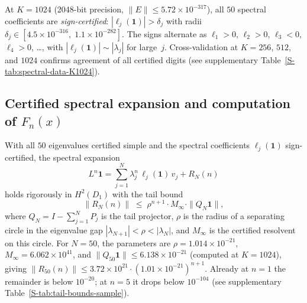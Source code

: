 At $K = 1024$ (2048-bit precision, $\|E\| \leq 5.72 \times 10^{-317}$),
all $50$ spectral coefficients are \emph{sign-certified}:
$|\ell_j(\mathbf{1})| > \delta_j$ with radii
$\delta_j \in [4.5 \times 10^{-316},\; 1.1 \times 10^{-282}]$.
The signs alternate as
$\ell_1 > 0$, $\ell_2 > 0$, $\ell_3 < 0$, $\ell_4 > 0$, \ldots,
with $|\ell_j(\mathbf{1})| \sim |\lambda_j|$ for large~$j$.
Cross-validation at $K = 256$, $512$, and $1024$ confirms agreement
of all certified digits
(see supplementary Table~\ref{S-tab:spectral-data-K1024}).

\subsection{Certified spectral expansion and computation of $F_n(x)$}
\label{sec:spectral-expansion}

With all $50$ eigenvalues certified simple and the spectral
coefficients $\ell_j(\mathbf{1})$ sign-certified, the spectral
expansion
\begin{equation}
\label{eq:spectral-exp-main}
L^n \mathbf{1}
  = \sum_{j=1}^{N} \lambda_j^n \, \ell_j(\mathbf{1}) \, v_j + R_N(n)
\end{equation}
holds rigorously in $H^2(D_1)$ with the tail bound
\begin{equation}
\label{eq:tail-bound}
\|R_N(n)\| \;\leq\; \rho^{n+1} \cdot M_\infty \cdot \|Q_N \mathbf{1}\|,
\end{equation}
where $Q_N = I - \sum_{j=1}^{N} P_j$ is the tail projector,
$\rho$ is the radius of a separating circle in the eigenvalue gap
$|\lambda_{N+1}| < \rho < |\lambda_N|$, and $M_\infty$ is the certified
resolvent on this circle.  For $N = 50$, the parameters are
$\rho = 1.014 \times 10^{-21}$,
$M_\infty = 6.062 \times 10^{41}$,
and $\|Q_{50}\mathbf{1}\| \leq 6.138 \times 10^{-21}$
(computed at $K = 1024$), giving
$\|R_{50}(n)\| \leq 3.72 \times 10^{21} \cdot (1.01 \times 10^{-21})^{n+1}$.
Already at $n = 1$ the remainder is below $10^{-20}$; at $n = 5$ it drops
below $10^{-104}$ (see supplementary Table~\ref{S-tab:tail-bounds-sample}).

